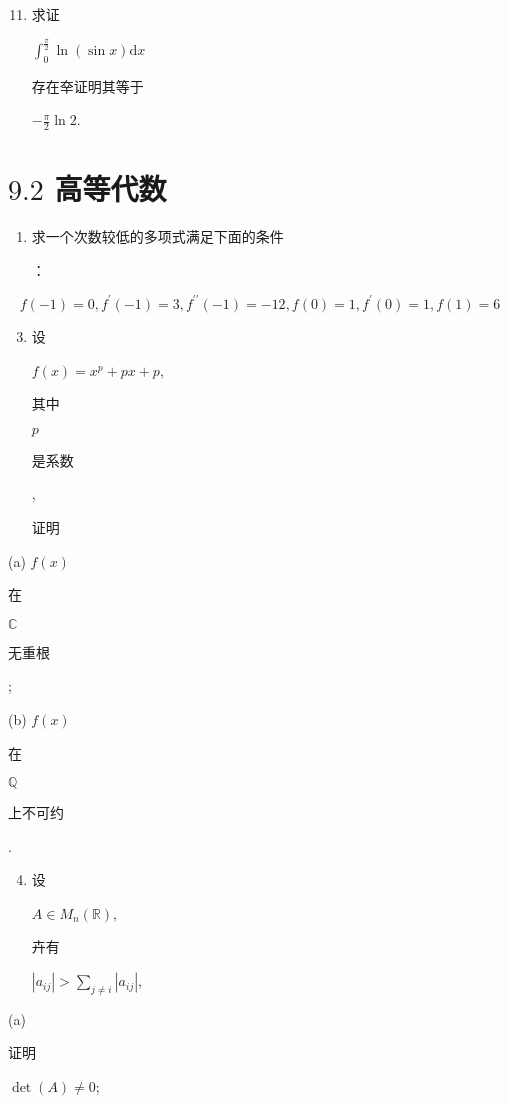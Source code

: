 \documentclass[10pt]{article}
\begin{document}
\begin{enumerate}
  \setcounter{enumi}{10}
  \item \begin{CJK}{UTF8}{mj}求证\end{CJK} $\int_{0}^{\frac{\pi}{2}} \ln (\sin x) \mathrm{d} x$ \begin{CJK}{UTF8}{mj}存在㚔证明其等于\end{CJK} $-\frac{\pi}{2} \ln 2$.
\end{enumerate}
\section{$9.2$ 高等代数}
\begin{enumerate}
  \item \begin{CJK}{UTF8}{mj}求一个次数较低的多项式满足下面的条件\end{CJK}：
\end{enumerate}
$$
f(-1)=0, f^{\prime}(-1)=3, f^{\prime \prime}(-1)=-12, f(0)=1, f^{\prime}(0)=1, f(1)=6
$$

\begin{enumerate}
  \setcounter{enumi}{2}
  \item \begin{CJK}{UTF8}{mj}设\end{CJK} $f(x)=x^{p}+p x+p$, \begin{CJK}{UTF8}{mj}其中\end{CJK} $p$ \begin{CJK}{UTF8}{mj}是系数\end{CJK}, \begin{CJK}{UTF8}{mj}证明\end{CJK}
\end{enumerate}
(a) $f(x)$ \begin{CJK}{UTF8}{mj}在\end{CJK} $\mathbb{C}$ \begin{CJK}{UTF8}{mj}无重根\end{CJK};

(b) $f(x)$ \begin{CJK}{UTF8}{mj}在\end{CJK} $\mathbb{Q}$ \begin{CJK}{UTF8}{mj}上不可约\end{CJK}.

\begin{enumerate}
  \setcounter{enumi}{3}
  \item \begin{CJK}{UTF8}{mj}设\end{CJK} $A \in M_{n}(\mathbb{R})$, \begin{CJK}{UTF8}{mj}卉有\end{CJK} $\left|a_{i j}\right|>\sum_{j \neq i}\left|a_{i j}\right|$,
\end{enumerate}
(a) \begin{CJK}{UTF8}{mj}证明\end{CJK} $\operatorname{det}(A) \neq 0$;
\end{document}
